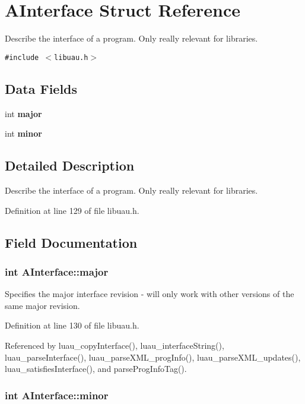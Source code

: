 \section{AInterface Struct Reference}
\label{structAInterface}
Describe the interface of a program. Only really relevant for libraries.  


{\tt \#include $<$libuau.h$>$}

\subsection*{Data Fields}
\begin{CompactItemize}
\item 
int {\bf major}
\item 
int {\bf minor}
\end{CompactItemize}


\subsection{Detailed Description}
Describe the interface of a program. Only really relevant for libraries. 



Definition at line 129 of file libuau.h.

\subsection{Field Documentation}
\subsubsection{\setlength{\rightskip}{0pt plus 5cm}int {\bf AInterface::major}}\label{structAInterface_o0}


Specifies the major interface revision - will only work with other versions of the same major revision. 

Definition at line 130 of file libuau.h.

Referenced by luau\_\-copy\-Interface(), luau\_\-interface\-String(), luau\_\-parse\-Interface(), luau\_\-parse\-XML\_\-prog\-Info(), luau\_\-parse\-XML\_\-updates(), luau\_\-satisfies\-Interface(), and parse\-Prog\-Info\-Tag().
\subsubsection{\setlength{\rightskip}{0pt plus 5cm}int {\bf AInterface::minor}}\label{structAInterface_o1}


